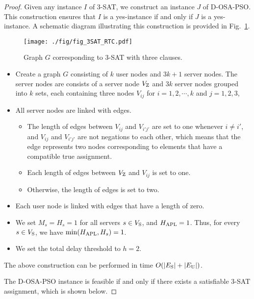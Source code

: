 \documentclass[10pt, letterpaper]{IEEEtran}
\begin{document}
\begin{CJK}{UTF8}{ipxm}
\begin{proof}
  Given any instance $I$ of 3-SAT, we construct an instance $J$ of D-OSA-PSO. This construction ensures that $I$ is a yes-instance if and only if $J$ is a yes-instance. %
  A schematic diagram illustrating this construction is provided in Fig.~\ref{fig:3SAT_RTC}.
  \begin{figure}[!t]
    \begin{center}
      \texttt{[image: ./fig/fig\_3SAT\_RTC.pdf]}
    \end{center}
    \caption{Graph $G$ corresponding to 3-SAT with three clauses.}
    \label{fig:3SAT_RTC}
  \end{figure}

  \begin{itemize}
    \item Create a graph $G$ consisting of $k$ user nodes and $3k+1$ server nodes. The server nodes are consists of a server node $V_{\rm Z}$ and $3k$ server nodes grouped into $k$ sets, each containing three nodes $V_{ij}$ for $i = 1, 2, \cdots, k$ and $j = 1, 2, 3$, 
    \item All server nodes are linked with edges.
    \begin{itemize}
      \item The length of edges between $V_{ij}$ and $V_{i'j'}$ are set to one whenever $i \neq i'$, and $V_{ij}$ and $V_{i'j'}$ are not negations to each other, which means that the edge represents two nodes corresponding to elements that have a compatible true assignment.
      \item Each length of edges between $V_{\rm Z}$ and $V_{ij}$ is set to one.
      \item Otherwise, the length of edges is set to two.
    \end{itemize}
    \item Each user node is linked with edges that have a length of zero.
    \item We set $M_s = H_s = 1$ for all servers $s \in V_{\rm S}$, and $H_{\rm APL} = 1$. Thus, for every $s \in V_{\rm S}$, we have $\min(H_{\rm APL}, H_s) = 1$.
    \item We set the total delay threshold to $h = 2$.
  \end{itemize}
The above construction can be performed in time $O(|E_{\rm S}| + |E_{\rm U}|)$.


The D-OSA-PSO instance is feasible if and only if there exists a satisfiable 3-SAT assignment, which is shown below.


\end{proof}
\end{CJK}
\end{document}
